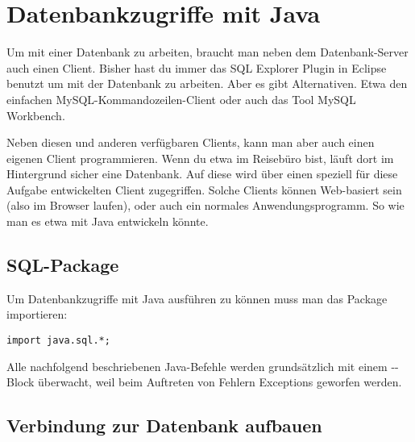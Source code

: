 \chapter{Datenbankzugriffe mit Java}
\renewcommand{\chaptertitle}{Datenbankzugriffe mit Java}

\lehead[]{\sf\hspace*{-2.00cm}\textcolor{white}{\colorbox{lightblue}{\makebox[1.60cm][r]{\thechapter}}}\hspace{0.17cm}\textcolor{lightblue}{\chaptertitle}}
\rohead[]{\textcolor{lightblue}{\chaptertitle}\sf\hspace*{0.17cm}\textcolor{white}{\colorbox{lightblue}{\makebox[1.60cm][l]{\thechapter}}}\hspace{-2.00cm}}
\rehead[]{\textcolor{lightblue}{AvHG, Inf, My}}
\lohead[]{\textcolor{lightblue}{AvHG, Inf, My}}

\lstset{style=myJava}

Um mit einer Datenbank zu arbeiten, braucht man neben dem Datenbank-Server auch
einen Client. Bisher hast du immer das SQL Explorer Plugin in Eclipse benutzt um 
mit der Datenbank zu arbeiten. Aber es gibt Alternativen. Etwa den einfachen
MySQL-Kommandozeilen-Client oder auch das Tool MySQL Workbench.

Neben diesen und anderen verfügbaren Clients, kann man aber auch einen eigenen
Client programmieren. Wenn du etwa im Reisebüro bist, läuft dort im Hintergrund
sicher eine Datenbank. Auf diese wird über einen speziell für diese Aufgabe
entwickelten Client zugegriffen. Solche Clients können Web-basiert sein (also
im Browser laufen), oder auch ein normales Anwendungsprogramm. So wie man es
etwa mit Java entwickeln könnte.

\section{SQL-Package}

Um Datenbankzugriffe mit Java ausführen zu können muss man das Package
 importieren:

\begin{lstlisting}
import java.sql.*;
\end{lstlisting}

Alle nachfolgend beschriebenen Java-Befehle werden grundsätzlich mit einem
--Block überwacht, weil beim Auftreten von Fehlern
Exceptions geworfen werden.

\section{Verbindung zur Datenbank aufbauen}


